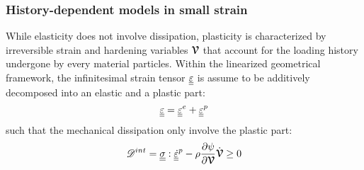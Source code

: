 \subsubsection*{History-dependent models in small strain}
While elasticity does not involve dissipation, plasticity is characterized by irreversible strain and hardening variables ${\boldsymbol{\mathcal{V}}}$ that account for the loading history undergone by every material particles. Within the linearized geometrical framework, the infinitesimal strain tensor ${\underline{\underline{\varepsilon}}}$ is assume to be additively decomposed into an elastic and a plastic part:
\begin{equation}
  \label{eq:additive_plast}
  {\underline{\underline{\varepsilon}}} = {\underline{\underline{\varepsilon}}}^e + {\underline{\underline{\varepsilon}}}^p
\end{equation}
such that the mechanical dissipation only involve the plastic part:
\begin{equation}
  \label{eq:HPP_dissipation}
  \mathscr{D}^{int}={\underline{\underline{\sigma}}}:{\underline{\underline{\dot{\varepsilon}}}}^p -\rho \frac{\partial \psi}{\partial {\boldsymbol{\mathcal{V}}}}\dot{{\boldsymbol{\mathcal{V}}}} \geq 0
\end{equation}

